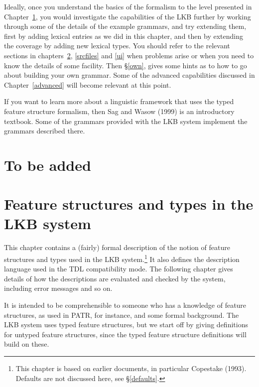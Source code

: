 \documentclass[12pt]{report}
\begin{document}
Ideally, once you understand the basics of the formalism to the level presented
in Chapter~\ref{easy}, you would investigate the capabilities of the LKB
further by working through some of the details of the example grammars, and try
extending them, first by adding lexical entries as we did in this chapter, and
then by extending the coverage by adding new lexical types.  You should refer
to the relevant sections in chapters~\ref{formal}, \ref{srcfiles} and \ref{ui}
when problems arise or when you need to know the details of some facility.
Then \S\ref{own}, gives some hints as to how to go about building your own
grammar.  Some of the advanced capabilities discussed in Chapter~\ref{advanced}
will become relevant at this point.

If you want to learn more about a
linguistic framework that uses the typed feature
structure formalism, then Sag and Wasow (1999) is
an introductory textbook.  Some of the grammars provided with the LKB system
implement the grammars described there.

\chapter{To be added}
\label{easy}

\chapter{Feature structures and types in the LKB system}
\label{formal}

This chapter contains a (fairly) formal description of the notion of
feature structures and types used in the LKB system.\footnote{This chapter is based
on earlier documents, in particular Copestake (1993).  
Defaults are not discussed here, see \S\ref{defaults}.}
It also defines the description language used in the TDL compatibility mode. 
The following chapter gives details of how the descriptions are
evaluated and checked by the system, including error messages and so on.
 
It is intended to be comprehensible
to someone who has a knowledge
of feature structures, as used in PATR, for instance, and some
formal background.  The LKB system
uses typed feature structures, but we start off by giving definitions
for untyped feature structures, since the typed feature structure
definitions will build on these.
\end{document}
